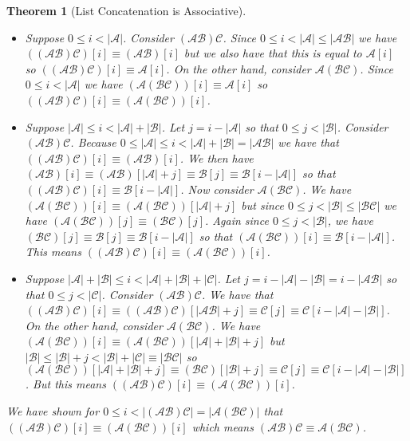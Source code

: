 \documentclass[12pt]{article}
\theoremstyle{break}
\theoremstyle{break}
\newtheorem{theorem}{Theorem}[section]
\theoremstyle{break}
\theoremstyle{break}
\theoremstyle{break}
\newtheorem{informal definition}[definition]{Informal Definition}
\newcommand{\mc}[1]{\mathcal{#1}}
\begin{document}
\begin{theorem}[List Concatenation is Associative]
\begin{itemize}
\item{Suppose $0\le i < |\mc{A}|$. Consider $(\mc{A}\mc{B})\mc{C}$. Since $0\le i < |\mc{A}| \le |\mc{A}\mc{B}|$ we have $((\mc{A}\mc{B})\mc{C})[i] \equiv (\mc{A}\mc{B})[i]$ but we also have that this is equal to $\mc{A}[i]$ so $((\mc{A}\mc{B})\mc{C})[i] \equiv \mc{A}[i]$. On the other hand, consider $\mc{A}(\mc{B}\mc{C})$. Since $0\le i < |\mc{A}|$ we have $(\mc{A}(\mc{B}\mc{C}))[i]\equiv \mc{A}[i]$ so $((\mc{A}\mc{B})\mc{C})[i] \equiv (\mc{A}(\mc{B}\mc{C}))[i]$.}
\item{Suppose $|\mc{A}| \le i < |\mc{A}| + |\mc{B}|$. Let $j = i - |\mc{A}|$ so that $0\le j < |\mc{B}|$.
Consider $(\mc{A}\mc{B})\mc{C}$. Because $0\le |\mc{A}| \le i < |\mc{A}|+|\mc{B}| = |\mc{A}\mc{B}|$ we have that $((\mc{A}\mc{B})\mc{C})[i] \equiv (\mc{A}\mc{B})[i]$.
We then have $(\mc{A}\mc{B})[i] \equiv (\mc{A}\mc{B})[|\mc{A}|+j] \equiv \mc{B}[j] \equiv \mc{B}[i - |\mc{A}|]$ so that $((\mc{A}\mc{B})\mc{C})[i] \equiv \mc{B}[i-|\mc{A}|]$. Now consider $\mc{A}(\mc{B}\mc{C})$. We have $(\mc{A}(\mc{B}\mc{C}))[i] \equiv (\mc{A}(\mc{B}\mc{C}))[|\mc{A}|+j]$ but since $0\le j < |\mc{B}| \le |\mc{B}\mc{C}|$ we have $(\mc{A}(\mc{B}\mc{C}))[j] \equiv (\mc{B}\mc{C})[j]$. Again since $0\le j < |\mc{B}|$, we have $(\mc{B}\mc{C})[j] \equiv \mc{B}[j]\equiv \mc{B}[i-|\mc{A}|]$ so that $(\mc{A}(\mc{B}\mc{C}))[i] \equiv \mc{B}[i-|\mc{A}|]$. This means $((\mc{A}\mc{B})\mc{C})[i] \equiv (\mc{A}(\mc{B}\mc{C}))[i]$.}
\item{Suppose $|\mc{A}| + |\mc{B}| \le i < |\mc{A}|+|\mc{B}|+|\mc{C}|$.
Let $j=i-|\mc{A}|-|\mc{B}| = i-|\mc{A}\mc{B}|$ so that $0\le j < |\mc{C}|$. Consider $(\mc{A}\mc{B})\mc{C}$. We have that $((\mc{A}\mc{B})\mc{C})[i] \equiv ((\mc{A}\mc{B})\mc{C})[|\mc{A}\mc{B}|+j] \equiv \mc{C}[j]\equiv \mc{C}[i-|\mc{A}|-|\mc{B}|]$. On the other hand, consider $\mc{A}(\mc{B}\mc{C})$. We have $(\mc{A}(\mc{B}\mc{C}))[i] \equiv (\mc{A}(\mc{B}\mc{C}))[|\mc{A}|+|\mc{B}|+j]$ but $|\mc{B}| \le |\mc{B}|+j < |\mc{B}|+|\mc{C}| \equiv |\mc{B}\mc{C}|$ so $(\mc{A}(\mc{B}\mc{C}))[|\mc{A}|+|\mc{B}|+j] \equiv (\mc{B}\mc{C})[|\mc{B}|+j] \equiv \mc{C}[j] \equiv \mc{C}[i-|\mc{A}|-|\mc{B}|]$. But this means $((\mc{A}\mc{B})\mc{C})[i] \equiv (\mc{A}(\mc{B}\mc{C}))[i]$.}
\end{itemize}

We have shown for $0\le i < |(\mc{A}\mc{B})\mc{C}| = |\mc{A}(\mc{B}\mc{C})|$ that $((\mc{A}\mc{B})\mc{C})[i] \equiv (\mc{A}(\mc{B}\mc{C}))[i]$ which means $(\mc{A}\mc{B})\mc{C}\equiv \mc{A}(\mc{B}\mc{C})$.
\end{theorem}
\end{document}
